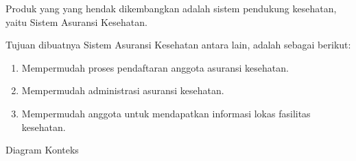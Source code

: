 Produk yang yang hendak dikembangkan adalah sistem pendukung kesehatan, yaitu Sistem Asuransi Kesehatan.\par
		{Tujuan dibuatnya Sistem Asuransi Kesehatan antara lain, adalah sebagai berikut:
		\begin{enumerate}
			\item Mempermudah proses pendaftaran anggota asuransi kesehatan.
			\item Mempermudah administrasi asuransi kesehatan.
			\item Mempermudah anggota untuk mendapatkan informasi lokas fasilitas kesehatan.
		\end{enumerate}}
		\par
		Diagram Konteks